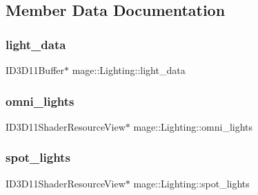 \subsection{Member Data Documentation}
\hypertarget{structmage_1_1_lighting_aa8c55bf975d3d77e8d598591a9268766}{}\label{structmage_1_1_lighting_aa8c55bf975d3d77e8d598591a9268766} 
\subsubsection{\texorpdfstring{light\+\_\+data}{light\_data}}
{\footnotesize\ttfamily I\+D3\+D11\+Buffer$\ast$ mage\+::\+Lighting\+::light\+\_\+data}

\hypertarget{structmage_1_1_lighting_add6b516f28826b888466df39f7db5e35}{}\label{structmage_1_1_lighting_add6b516f28826b888466df39f7db5e35} 
\subsubsection{\texorpdfstring{omni\+\_\+lights}{omni\_lights}}
{\footnotesize\ttfamily I\+D3\+D11\+Shader\+Resource\+View$\ast$ mage\+::\+Lighting\+::omni\+\_\+lights}

\hypertarget{structmage_1_1_lighting_a6d9e373787f009cabac09319074aaf2e}{}\label{structmage_1_1_lighting_a6d9e373787f009cabac09319074aaf2e} 
\subsubsection{\texorpdfstring{spot\+\_\+lights}{spot\_lights}}
{\footnotesize\ttfamily I\+D3\+D11\+Shader\+Resource\+View$\ast$ mage\+::\+Lighting\+::spot\+\_\+lights}

